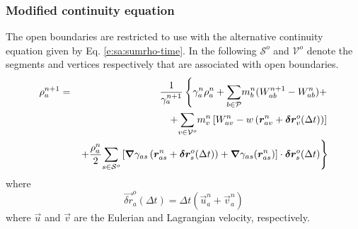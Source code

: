 \documentclass{../GPUSPHtemplate}
\begin{document}
\subsubsection{Modified continuity equation}
The open boundaries are restricted to use with the alternative
continuity equation given by Eq. \eqref{e:sa:sumrho-time}. In the
following $\mathcal{S}^o$ and $\mathcal{V}^o$ denote the segments and
vertices respectively that are associated with open boundaries.
\begin{eqnarray}
\rho_a^{n+1} &=& \frac{1}{\gamma_a^{n+1}}\left\{ \gamma_a^n \rho_a^n +
\underset{b \in \mathcal{P}}{\sum} m_b^n (W_{ab}^{n+1} - W_{ab}^n) + \right.
\label{e:open:sumrho-time}
\\
&&\left. + \underset{v\in\mathcal{V}^o}{\sum}m_v^n\left[ W_{av}^n -
w\left( \bm{r}_{av}^n + \bm{\delta r}_v^o(\Delta t) \right) \right]\right.
\nonumber
\\
&&\left. + \frac{\rho_a^n}{2}\underset{s\in\mathcal{S}^o}{\sum}\left[
\bm{\nabla}\gamma_{as}\left(\bm{r}_{as}^n + \bm{\delta r}_s^o(\Delta t)\right) +
\bm{\nabla}\gamma_{as}(\bm{r}_{as}^n)
\right]\cdot\bm{\delta r}_s^o(\Delta t)\right\}
\nonumber
\end{eqnarray}
where
\begin{equation}
\vec{\delta r}_a^o(\Delta t) = \Delta t (\vec{u}_a^n + \vec{v}_a^n)
\label{e:open:deltar}
\end{equation}
where $\vec{u}$ and $\vec{v}$ are the Eulerian and Lagrangian
velocity, respectively.
\end{document}
